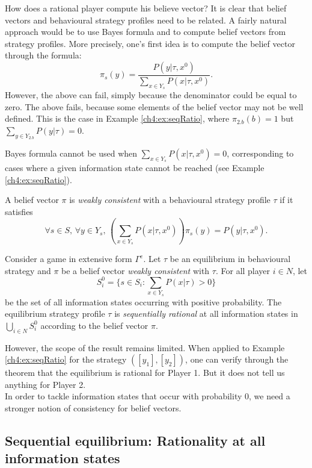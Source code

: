 How does a rational player compute his believe vector?
It is clear that belief vectors and behavioural strategy profiles need to be related. A fairly natural approach  would be to use Bayes formula and to compute belief vectors from strategy profiles.
More precisely, one's first idea is to compute the belief vector through the formula:
$$ \pi_s(y) = \frac{P(y | \tau, x^0)}{\sum_{x \in Y_s} P(x | \tau, x^0)}. $$
However, the above can fail, simply because the denominator could be equal to zero. The above fails, because some elements of the belief vector may not be well defined. This is the case in Example \ref{ch4:ex:seqRatio}, where $\pi_{2.b}(b) = 1$ but  $ \sum_{y \in Y_{2.b}} P(y | \tau) = 0$.

Bayes formula cannot be used when $\sum_{x \in Y_s} P(x | \tau, x^0) = 0$, corresponding to cases where a given information state cannot be reached (see Example \ref{ch4:ex:seqRatio}).

\begin{definition}
A belief vector $\pi$ is \emph{weakly consistent} with a behavioural strategy profile $\tau$  if it
satisfies
$$\forall s \in S, \, \forall y \in Y_s, \, \left (\sum_{x \in Y_s} P(x | \tau, x^0)\right ) \pi_s(y) =  P(y | \tau, x^0).$$
\end{definition}

\begin{theorem}
Consider a game in extensive form $\Gamma^e$. Let $\tau$ be an equilibrium in behavioural strategy and $\pi$ be a belief vector \emph{weakly consistent} with $\tau$.
For all player $i \in N$, let
$$
S^0_i = \{s \in S_i : \sum_{x \in Y_s} P(x| \tau) > 0\}
$$
be the set of all information states occurring with positive probability.
The equilibrium strategy profile $\tau$ is \emph{sequentially rational} at all information states in $\bigcup_{i \in N} S^0_i$ according to the belief vector $\pi$.
\label{ch4:th:WeakRatio}
\end{theorem}

However, the scope of the result remains limited. When applied to Example \ref{ch4:ex:seqRatio} for the strategy $([y_1],[y_2])$, one can verify through the theorem that the equilibrium is rational for Player 1. But it does not tell us anything for Player 2.\\
In order to tackle information states that occur with probability 0, we need a stronger notion of consistency for belief vectors.

\subsection{Sequential equilibrium: Rationality at all information states}

